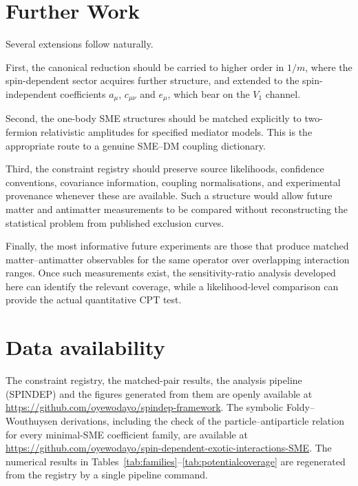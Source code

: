 \documentclass[aps,prd,reprint,superscriptaddress,nofootinbib]{revtex4-2}
\begin{document}
	\section{Further Work}
	
	Several extensions follow naturally.
	
	First, the canonical reduction should be carried to higher order in
$1/m$, where the spin-dependent sector acquires further structure, and
extended to the spin-independent coefficients $a_\mu$, $c_{\mu\nu}$ and
$e_\mu$, which bear on the $V_1$ channel.
	
	Second, the one-body SME structures should be matched explicitly to
	two-fermion relativistic amplitudes for specified mediator models.
	This is the appropriate route to a genuine SME--DM coupling dictionary.
	
	Third, the constraint registry should preserve source likelihoods,
	confidence conventions, covariance information, coupling
	normalisations, and experimental provenance whenever these are
	available. Such a structure would allow future matter and antimatter
	measurements to be compared without reconstructing the statistical
	problem from published exclusion curves.
	
	Finally, the most informative future experiments are those that produce
	matched matter--antimatter observables for the same operator over
	overlapping interaction ranges. Once such measurements exist, the
	sensitivity-ratio analysis developed here can identify the relevant
	coverage, while a likelihood-level comparison can provide the actual
	quantitative CPT test.
	
\section*{Data availability}

{\raggedright
The constraint registry, the matched-pair results, the analysis
pipeline (SPINDEP) and the figures generated from them are openly
available at \url{https://github.com/oyewodayo/spindep-framework}. The
symbolic Foldy--Wouthuysen derivations, including the check of the
particle--antiparticle relation for every minimal-SME coefficient
family, are available at
\url{https://github.com/oyewodayo/spin-dependent-exotic-interactions-SME}.
The numerical results in Tables~\ref{tab:families}--\ref{tab:potentialcoverage}
are regenerated from the registry by a single pipeline command.\par}
\end{document}
